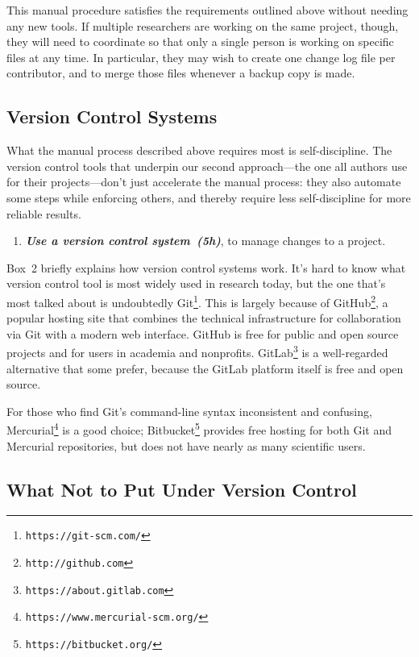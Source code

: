 \documentclass[10pt,letterpaper]{article}
\newcommand{\withurl}[2]{{#1}\footnote{{\texttt{#2}}}}
\newcommand{\practice}[2]{\textbf{\emph{{#2}~({#1})}}}
\begin{document}
This manual procedure satisfies the requirements outlined above
without needing any new tools. If multiple researchers are working on
the same project, though, they will need to coordinate so that only a
single person is working on specific files at any time. In particular,
they may wish to create one change log file per contributor, and to
merge those files whenever a backup copy is made.

\subsection*{Version Control Systems}

What the manual process described above requires most is
self-discipline. The version control tools that underpin our second
approach---the one all authors use for their projects---don't just
accelerate the manual process: they also automate some steps while
enforcing others, and thereby require less self-discipline for more
reliable results.

\begin{enumerate}

\item
  \practice{5h}{Use a version control system}, to manage changes
  to a project.

\end{enumerate}

Box~2 briefly explains how version control systems work.
It's hard to know what version control tool is most widely used in
research today, but the one that's most talked about is undoubtedly
\withurl{Git}{https://git-scm.com/}. This is largely because of
\withurl{GitHub}{http://github.com}, a popular hosting site that
combines the technical infrastructure for collaboration via Git with
a modern web interface. GitHub is free for public and open source
projects and for users in academia and nonprofits.
\withurl{GitLab}{https://about.gitlab.com} is a well-regarded
alternative that some prefer, because the GitLab platform itself is
free and open source.

For those who find Git's command-line syntax inconsistent
and confusing, \withurl{Mercurial}{https://www.mercurial-scm.org/} is
a good choice; \withurl{Bitbucket}{https://bitbucket.org/} provides
free hosting for both Git and Mercurial repositories, but does not
have nearly as many scientific users.

\subsection*{What Not to Put Under Version Control}
\end{document}
